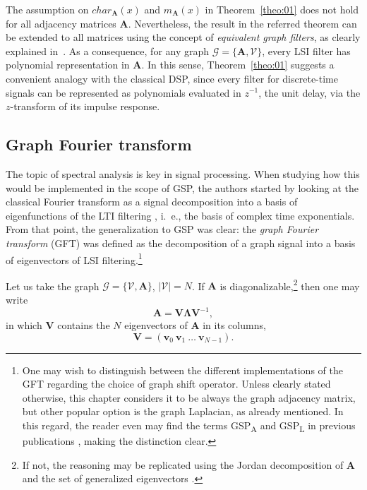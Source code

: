 The assumption on $char_{\mathbf{A}}(x)$ and $m_{\mathbf{A}}(x)$ in Theorem~\ref{theo:01} does not hold for all adjacency matrices $\mathbf{A}$. Nevertheless, the result in the referred theorem can be extended to all matrices using the concept of \emph{equivalent graph filters}, as clearly explained in~\cite{sandryhaila2013filters}. As a consequence, for any graph $\mathcal{G} = \{\mathbf{A}, \mathcal{V}\}$, every LSI filter has polynomial representation in $\mathbf{A}$. In this sense, Theorem~\ref{theo:01} suggests a convenient analogy with the classical DSP, since every filter for discrete-time signals can be represented as polynomials evaluated in $ z^{-1} $, the unit delay, via the $z$-transform of its impulse response.

\subsection{Graph Fourier transform}

The topic of spectral analysis is key in signal processing. When studying how this would be implemented in the scope of GSP, the authors started by looking at the classical Fourier transform as a signal decomposition into a basis of eigenfunctions of the LTI filtering \cite{oppenheim1997signals}, i.~e., the basis of complex time exponentials. From that point, the generalization to GSP was clear: the \emph{graph Fourier transform} (GFT) was defined as the decomposition of a graph signal into a basis of eigenvectors of LSI filtering.\footnote{One may wish to distinguish between the different implementations of the GFT regarding the choice of graph shift operator. Unless clearly stated otherwise, this chapter considers it to be always the graph adjacency matrix, but other popular option is the graph Laplacian, as already mentioned. In this regard, the reader even may find the terms GSP\textsubscript{A} and GSP\textsubscript{L} in previous publications \cite{ribeiro2018}, making the distinction clear.}

Let us take the graph $ \mathcal{G} = \{\mathcal{V}, \mathbf{A}\} $, $ |\mathcal{V}| =N $. If $ \mathbf{A} $ is diagonalizable,\footnote{If not, the reasoning may be replicated using the Jordan decomposition of $ \mathbf{A} $ and the set of generalized eigenvectors \cite{deri2017spectral}.} then one may write
\begin{equation}\label{eq:gft_01}
\mathbf{A} = \mathbf{V} \mathbf{\Lambda} \mathbf{V}^{-1},
\end{equation}
in which $ \mathbf{V} $ contains the $ N $ eigenvectors of $ \mathbf{A} $ in its columns,
\begin{equation}\label{eq:gft_02}
\mathbf{V} = (\mathbf{v}_0 \ \mathbf{v}_1 \ \dots\ \mathbf{v}_{N-1}).
\end{equation}

